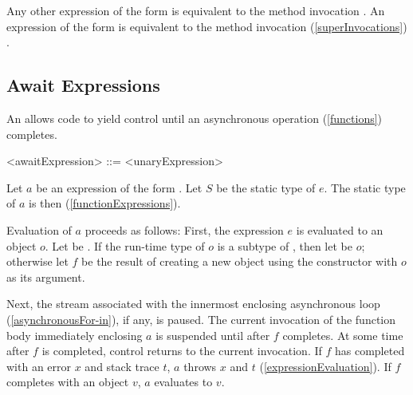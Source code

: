 \documentclass[makeidx]{article}
\begin{document}
{\LMHash{}%
Any other expression of the form  is equivalent to
the method invocation .
An expression of the form  is equivalent to
the method invocation (\ref{superInvocations}) .


\subsection{Await Expressions}

\LMHash{}%
An  allows code to
yield control until an asynchronous operation
(\ref{functions})
completes.

\begin{grammar}
<awaitExpression> ::= \AWAIT{} <unaryExpression>
\end{grammar}

\LMHash{}%
%
Let $a$ be an expression of the form .
Let $S$ be the static type of $e$.
The static type of $a$ is then 
(\ref{functionExpressions}).

\LMHash{}%
Evaluation of $a$ proceeds as follows:
First, the expression $e$ is evaluated to an object $o$.
Let  be .
If the run-time type of $o$ is a subtype of ,
then let  be $o$;
otherwise let $f$ be the result of creating
a new object using the constructor 
with $o$ as its argument.

\LMHash{}%
Next, the stream associated with
the innermost enclosing asynchronous \FOR{} loop
(\ref{asynchronousFor-in}),
if any, is paused.
The current invocation of the function body immediately enclosing $a$
is suspended until after $f$ completes.
At some time after $f$ is completed, control returns to the current invocation.
If $f$ has completed with an error $x$ and stack trace $t$,
$a$ throws $x$ and $t$
(\ref{expressionEvaluation}).
If $f$ completes with an object $v$, $a$ evaluates to $v$.


}
\end{document}
